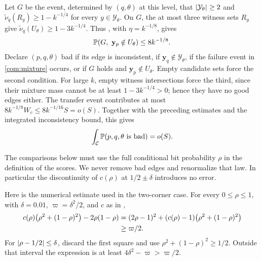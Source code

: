 Let \(G\) be the event, determined by \((q,\theta)\) at this level, that
\(\lvert \mathcal Y_\theta\rvert\ge2\) and
\(\widetilde\nu_q(R_y)\ge1-k^{-1/4}\) for every
\(y\in\mathcal Y_\theta\). On \(G\), the at most three witness sets \(R_y\)
give \(\widetilde\nu_q(U_\theta)\ge1-3k^{-1/4}\). Thus
, with \(\eta=k^{-1/8}\), gives
\[
 \mathbb P(G,\ \mathbf y_p\notin U_\theta)\le8k^{-1/8}.
\]
Declare \((p,q,\theta)\) bad if its edge is inconsistent, if
\(\mathbf y_q\notin\mathcal Y_\theta\), if the failure event in
\eqref{com:mixture} occurs, or if \(G\) holds and \(\mathbf y_p\notin U_\theta\).
Empty candidate sets force the second condition. For large \(k\), empty
witness intersections force the third, since their mixture mass cannot
be at least \(1-3k^{-1/4}>0\); hence they have no good edges either.
The transfer event contributes at most
\(8k^{-1/8}W_c\le8k^{-1/16}S=o(S)\). Together with the preceding
estimates and the integrated inconsistency bound, this gives
\begin{equation}\label{com:bad-mass}
 \int_{\mathcal C}\mathbb P(p,q,\theta\text{ is bad})=o(S).
\end{equation}

The comparisons below must use the full conditional bit probability
\(\rho\) in the definition of the scores. We never remove bad edges and
renormalize that law. In particular the discontinuity of \(c(\rho)\) at
\(1/2\pm\delta\) introduces no error.

Here is the numerical estimate used in the two-corner case. For every
\(0\le\rho\le1\), with \(\delta=0.01\), \(\varpi=\delta^2/2\), and
\(c\) as in ,
\begin{align}
 c(\rho)\bigl(\rho^2+(1-\rho)^2\bigr)-2\rho(1-\rho)
 &= (2\rho-1)^2+
       (c(\rho)-1)\bigl(\rho^2+(1-\rho)^2\bigr)\notag\\
 &\ge\varpi/2.\label{com:score-polynomial}
\end{align}
For \(\lvert \rho-1/2\rvert\le\delta\), discard the first square and use
\(\rho^2+(1-\rho)^2\ge1/2\). Outside that interval the expression is at
least \(4\delta^2-\varpi>\varpi/2\).



